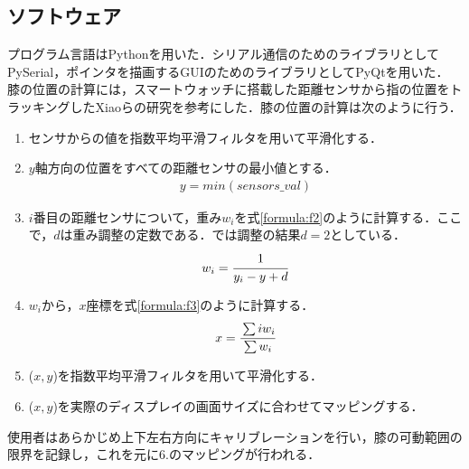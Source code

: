 


\subsection{ソフトウェア} 
プログラム言語はPythonを用いた．シリアル通信のためのライブラリとしてPySerial，ポインタを描画するGUIのためのライブラリとしてPyQtを用いた．
膝の位置の計算には，スマートウォッチに搭載した距離センサから指の位置をトラッキングしたXiaoら\cite{Xiao:2018:LOP:3173574.3173669}の研究を参考にした．膝の位置の計算は次のように行う．
\begin{enumerate}
	\item センサからの値を指数平均平滑フィルタを用いて平滑化する．
	\item $y$軸方向の位置をすべての距離センサの最小値とする．
		\begin{eqnarray}
		 	y = min(sensors\_val)
		 	\label{formula:f1}
		\end{eqnarray}
	\item $i$番目の距離センサについて，重み$w_i$を式\ref{formula:f2}のように計算する．ここで，$d$は重み調整の定数である．\SysName では調整の結果$d=2$としている．
		\begin{eqnarray}
			w_i = \cfrac{1}{y_i - y + d}
		\label{formula:f2}
	\end{eqnarray}
	\item $w_i$から，$x$座標を式\ref{formula:f3}のように計算する．
		\begin{eqnarray}
		 	x =\cfrac{\sum iw_i}{\sum w_i}
		 	\label{formula:f3}
		\end{eqnarray} 
	\item ($x,y$)を指数平均平滑フィルタを用いて平滑化する．
	\item ($x,y$)を実際のディスプレイの画面サイズに合わせてマッピングする．
\end{enumerate}
使用者はあらかじめ上下左右方向にキャリブレーションを行い，膝の可動範囲の限界を記録し，これを元に6.のマッピングが行われる．


